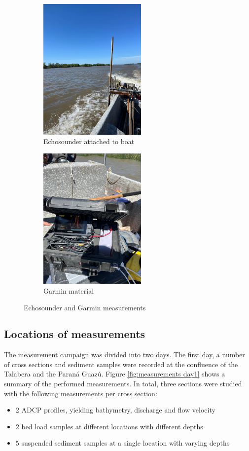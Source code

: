 \begin{figure}[H]
    \centering
    \begin{subfigure}[b]{0.48\textwidth}
        \includegraphics[width=\linewidth, height=7cm]{figures/ch4/Echosounder.jpg}
        \caption{Echosounder attached to boat}
        \label{fig:sontek}
    \end{subfigure}
    \hfill
    \begin{subfigure}[b]{0.48\textwidth}
        \includegraphics[width=\linewidth, height=7cm]{figures/ch4/garmin.jpg}
        \caption{Garmin material}
        \label{fig:sontek}
    \end{subfigure}
    \caption{Echosounder and Garmin measurements}
    \label{fig:Garmin}
\end{figure}




\subsection{Locations of measurements}
The measurement campaign was divided into two days. The first day, a number of cross sections and sediment samples were recorded at the confluence of the Talabera and the Paraná Guazú. Figure \ref{fig:measurements day1} shows a summary of the performed measurements. In total, three sections were studied with the following measurements per cross section:
\begin{itemize}
    \item 2 ADCP profiles, yielding bathymetry, discharge and flow velocity
    \item 2 bed load samples at different locations with different depths
    \item 5 suspended sediment samples at a single location with varying depths
\end{itemize}

